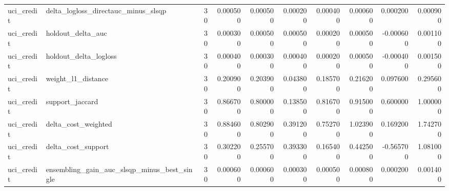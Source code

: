 \begin{landscape}
\begin{longtable}{llrrrrrrrr}
uci\_credit & delta\_logloss\_directauc\_minus\_slsqp & 30 & 0.000500 & 0.000500 & 0.000200 & 0.000400 & 0.000600 & 0.000200 & 0.000900 \\
uci\_credit & holdout\_delta\_auc & 30 & 0.000300 & 0.000500 & 0.000500 & 0.000200 & 0.000500 & -0.000600 & 0.001100 \\
uci\_credit & holdout\_delta\_logloss & 30 & 0.000400 & 0.000300 & 0.000400 & 0.000200 & 0.000500 & -0.000400 & 0.001500 \\
uci\_credit & weight\_l1\_distance & 30 & 0.200900 & 0.203900 & 0.043800 & 0.185700 & 0.216200 & 0.097600 & 0.295600 \\
uci\_credit & support\_jaccard & 30 & 0.866700 & 0.800000 & 0.138500 & 0.816700 & 0.915000 & 0.600000 & 1.000000 \\
uci\_credit & delta\_cost\_weighted & 30 & 0.884600 & 0.802900 & 0.391200 & 0.752700 & 1.023900 & 0.169200 & 1.742700 \\
uci\_credit & delta\_cost\_support & 30 & 0.302200 & 0.255700 & 0.393300 & 0.165400 & 0.442500 & -0.565700 & 1.081000 \\
uci\_credit & ensembling\_gain\_auc\_slsqp\_minus\_best\_single & 30 & 0.000600 & 0.000600 & 0.000300 & 0.000500 & 0.000800 & 0.000200 & 0.001400 \\
\end{longtable}\endgroup

\end{landscape}

